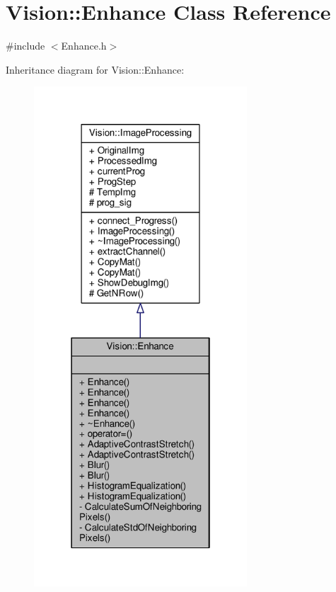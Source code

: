 \hypertarget{class_vision_1_1_enhance}{}\section{Vision\+:\+:Enhance Class Reference}
\label{class_vision_1_1_enhance}


{\ttfamily \#include $<$Enhance.\+h$>$}



Inheritance diagram for Vision\+:\+:Enhance\+:\nopagebreak
\begin{figure}[H]
\begin{center}
\leavevmode
\includegraphics[width=226pt]{class_vision_1_1_enhance__inherit__graph}
\end{center}
\end{figure}


